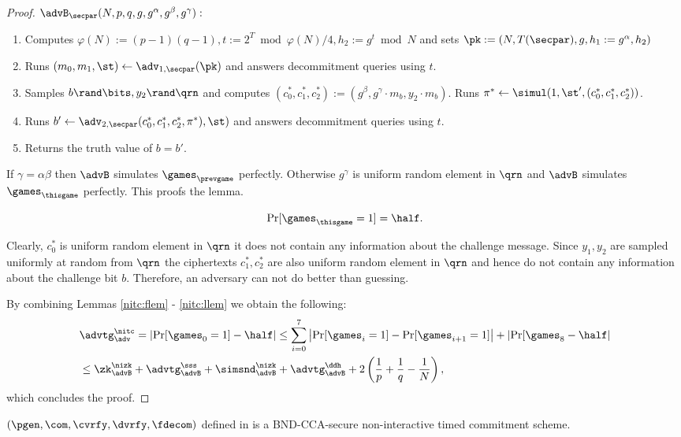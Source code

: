 \begin{proof}
$\advB_{\secpar}(N,p,q,g,g^\alpha, g^\beta, g^\gamma):$
\vspace{-2mm}
\begin{enumerate}
\item Computes $\varphi(N):=(p-1)(q-1), t:=2^{T} \bmod \varphi(N)/4, h_2:=g^t \bmod N$ and sets $\pk:=(N, T(\secpar), g, h_1: = g^\alpha, h_2)$
\item Runs $(m_0, m_1, \st) \leftarrow \adv_{1, \secpar}(\pk)$ and answers decommitment queries using $t$.
\item Samples $b \rand \bits, y_2 \rand \qrn$ and computes $(c_0^*, c_1^*, c_2^*):=(g^\beta, g^\gamma \cdot m_b, y_2 \cdot m_b).$ Runs $\pi^* \leftarrow \simul(1, \st', (c_0^*, c_1^*, c_2^*))$.
\item Runs $b' \leftarrow \adv_{2, \secpar}(c_0^*, c_1^*, c_2^*, \pi^*), \st)$ and answers decommitment queries using $t$.
\item Returns the truth value of $b=b'$.
\end{enumerate}
If $\gamma = \alpha\beta$ then $\advB$ simulates $\games_\prevgame$ perfectly. Otherwise $g^\gamma$ is uniform random element in $\qrn$ and $\advB$ simulates $\games_\thisgame$ perfectly. This proofs the lemma.

\begin{lemma}\label{nitc:llem}
\[
\Pr[\games_\thisgame = 1] = \half.
\]
\end{lemma}

Clearly, $c_0^*$ is uniform random element in $\qrn$ it does not contain any information about the challenge message. Since $y_1, y_2$ are sampled uniformly at random from $\qrn$ the ciphertexts $c_1^*, c_2^*$ are also uniform random element in $\qrn$ and hence do not contain any information about the challenge bit $b$. Therefore, an adversary can not do better than guessing.

By combining Lemmas \ref{nitc:flem} - \ref{nitc:llem} we obtain the following:
\begin{align*}
&\advtg^{\nitc}_{\adv} = \left| \Pr[\games_0 = 1] - \half \right| \leq \sum_{i=0}^7 \left|\Pr[\games_i = 1] - \Pr[\games_{i+1} = 1] \right| + \left|\Pr[\games_{8}- \half\right| \\
 &\leq \zk^\nizk_\advB + \advtg^{\sss}_{\advB} + \simsnd^{\nizk}_{\advB} + \advtg^{\ddh}_{\advB}  + 2 \left( \frac{1}{p}+\frac{1}{q}-\frac{1}{N} \right),
\end{align*}
which concludes the proof.
\end{proof}

\begin{theorem}
$(\pgen, \com, \cvrfy, \dvrfy, \fdecom)$ defined in  is a BND-CCA-secure non-interactive timed commitment scheme. 
\end{theorem}

